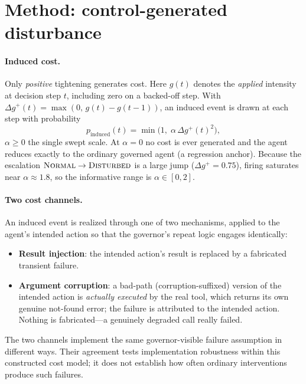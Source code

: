 \documentclass[11pt]{article}
\begin{document}
\section{Method: control-generated disturbance}
\label{sec:method}

\paragraph{Induced cost.}
Only \emph{positive} tightening generates cost. Here $g(t)$ denotes the
\emph{applied} intensity at decision step $t$, including zero on a backed-off
step. With
$\Delta g^{+}(t)=\max(0,\,g(t)-g(t-1))$, an induced event is drawn at each step
with probability
\begin{equation}
p_{\mathrm{induced}}(t)=\min\!\big(1,\;\alpha\,\Delta g^{+}(t)^2\big),
\label{eq:pinduced}
\end{equation}
$\alpha\ge0$ the single swept scale. At $\alpha=0$ no cost is ever generated
and the agent reduces exactly to the ordinary governed agent (a regression
anchor). Because the escalation $\textsc{Normal}\to\textsc{Disturbed}$ is a
large jump ($\Delta g^{+}=0.75$), firing saturates near $\alpha\approx1.8$, so
the informative range is $\alpha\in[0,2]$.

\paragraph{Two cost channels.}
An induced event is realized through one of two mechanisms, applied to the
agent's intended action so that the governor's repeat logic engages
identically:
\begin{itemize}[leftmargin=1.4em,itemsep=2pt]
\item \textbf{Result injection}: the intended action's result is replaced by a
fabricated transient failure.
\item \textbf{Argument corruption}: a bad-path (corruption-suffixed) version of
the intended action is \emph{actually executed} by the real tool, which returns
its own genuine not-found error; the failure is attributed to the intended
action. Nothing is fabricated---a genuinely degraded call really failed.
\end{itemize}
The two channels implement the same governor-visible failure assumption in
different ways. Their agreement tests implementation robustness within this
constructed cost model; it does not establish how often ordinary interventions
produce such failures.
\end{document}
